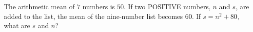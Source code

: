 The arithmetic mean of $7$ numbers is $50$. If two POSITIVE numbers, $n$ and $s$, are added to the list, the mean of the nine-number list becomes $60$. If $s = n^2+80$, what are $s$ and $n$?
